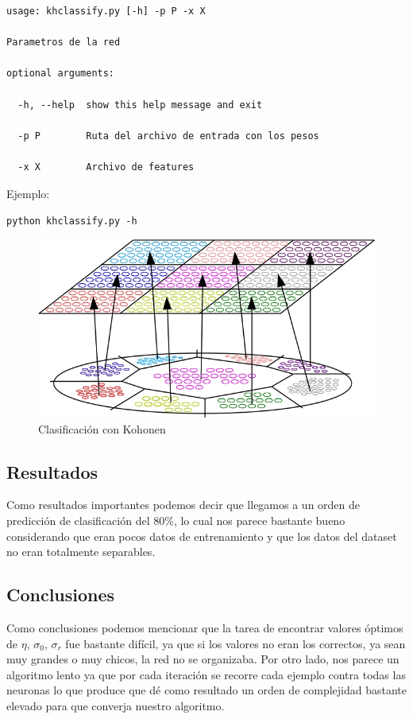 \begin{lstlisting}[style=bash]
usage: khclassify.py [-h] -p P -x X

Parametros de la red

optional arguments:

  -h, --help  show this help message and exit

  -p P        Ruta del archivo de entrada con los pesos

  -x X        Archivo de features
\end{lstlisting}

Ejemplo:

\noindent\texttt{python khclassify.py -h} \\

\begin{figure}[ht!]
	\centering
	\includegraphics[width=0.8\linewidth]{img/parte2-kohonen9clases.jpg}
	\caption{Clasificación con Kohonen}
	\label{Kohonen}
\end{figure}


\subsection{Resultados}
Como resultados importantes podemos decir que llegamos a un orden de predicción de clasificación del 80$\%$, lo cual nos parece bastante bueno considerando que eran pocos datos de entrenamiento y que los datos del dataset no eran totalmente separables.

\subsection{Conclusiones}
Como conclusiones podemos mencionar que la tarea de encontrar valores óptimos de $\eta$, $\sigma_{0}$, $\sigma_{r}$ fue bastante difícil, ya que si los valores no eran los correctos, ya sean muy grandes o muy chicos, la red no se organizaba.
Por otro lado, nos parece un algoritmo lento ya que por cada iteración se recorre cada ejemplo contra todas las neuronas lo que produce que dé como resultado un orden de complejidad bastante elevado para que converja nuestro algoritmo.